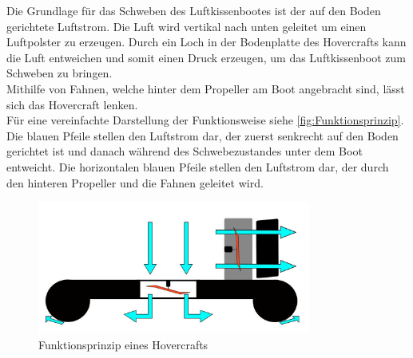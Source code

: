 Die Grundlage für das Schweben des Luftkissenbootes ist der auf den Boden gerichtete Luftstrom. Die Luft wird vertikal nach unten geleitet um einen Luftpolster zu erzeugen. 
Durch ein Loch in der Bodenplatte des Hovercrafts kann die Luft entweichen und somit einen Druck erzeugen, um das Luftkissenboot zum Schweben zu bringen. \\
Mithilfe von Fahnen, welche hinter dem Propeller am Boot angebracht sind, lässt sich das Hovercraft lenken. \\ Für eine vereinfachte Darstellung der Funktionsweise siehe 
\autoref{fig:Funktionsprinzip}. Die blauen Pfeile stellen den Luftstrom dar, der zuerst senkrecht auf den Boden gerichtet ist und danach während des Schwebezustandes unter dem Boot
entweicht. Die horizontalen blauen Pfeile stellen den Luftstrom dar, der durch den hinteren Propeller und die Fahnen geleitet wird. 

\begin{figure}[H]
  \centering
  \includegraphics[width=0.8\textwidth]{Fotos/Funktionsprinzip.JPG}
  \caption{Funktionsprinzip eines Hovercrafts  \label{fig:Funktionsprinzip}}
\end{figure}